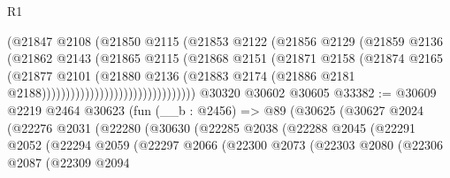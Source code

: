 \begin{lexlean}{R1}
\begin{coremodule}
                                        (@21847
                                          @2108
                                          (@21850
                                            @2115
                                            (@21853
                                              @2122
                                              (@21856
                                                @2129
                                                (@21859
                                                  @2136
                                                  (@21862
                                                    @2143
                                                    (@21865
                                                      @2115
                                                      (@21868
                                                        @2151
                                                        (@21871
                                                          @2158
                                                          (@21874
                                                            @2165
                                                            (@21877
                                                              @2101
                                                              (@21880
                                                                @2136
                                                                (@21883
                                                                  @2174
                                                                  (@21886
                                                                    @2181
                                                                    @2188))))))))))))))))))))))))))))))))
    @30320
    @30602
    @30605
@33382 := @30609
    @2219
    @2464
    @30623
    (fun (__b : @2456) =>
    @89
      (@30625
        (@30627
          @2024
          (@22276
            @2031
            (@22280
              (@30630
                (@22285
                  @2038
                  (@22288
                    @2045
                    (@22291
                      @2052
                      (@22294
                        @2059
                        (@22297
                          @2066
                          (@22300
                            @2073
                            (@22303
                              @2080
                              (@22306
                                @2087
                                (@22309
                                  @2094

\end{coremodule}
\end{lexlean}
